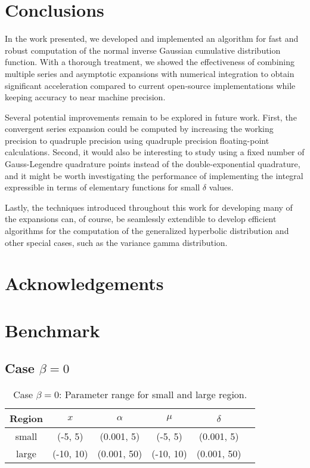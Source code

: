 \documentclass[10pt,a4paper,oneside]{article}
\numberwithin{equation}{section}
\begin{document}
\section{Conclusions}
In the work presented, we developed and implemented an algorithm for fast and robust computation of the normal inverse Gaussian cumulative distribution function.
With a thorough treatment, we showed the effectiveness of combining multiple series and asymptotic expansions with numerical integration to obtain significant
acceleration compared to current open-source implementations while keeping accuracy to near machine precision.

Several potential improvements remain to be explored in future work. First, the convergent series expansion could be computed by increasing the working precision to quadruple
precision using quadruple precision floating-point calculations. Second, it would also be interesting to study using a fixed number of Gauss-Legendre quadrature points instead of the double-exponential quadrature, and it might be worth investigating the performance of implementing the integral expressible in terms of elementary functions for small $\delta$ values.

Lastly, the techniques introduced throughout this work for developing many of the expansions can, of course, be seamlessly extendible to develop efficient algorithms for the computation of the generalized hyperbolic distribution and other special cases, such as the variance gamma distribution.

\section{Acknowledgements}


\appendix

\section{Benchmark}

\subsection{Case $\beta = 0$}
\begin{table}[H]
\centering
\scalebox{0.9}
{
	\begin{tabular}{c|ccccc}
	\hline
	Region & $x$ & $\alpha$ & $\mu$ & $\delta$\\
	\hline	
	small & (-5, 5) & (0.001, 5) & (-5, 5) & (0.001, 5)\\
	large & (-10, 10) & (0.001, 50) & (-10, 10) & (0.001, 50)\\
	\hline	
	\end{tabular}
}
\caption{Case $\beta = 0$: Parameter range for small and large region.}
	\label{table_parameters_case_beta_eq_zero}
\end{table}
\end{document}

